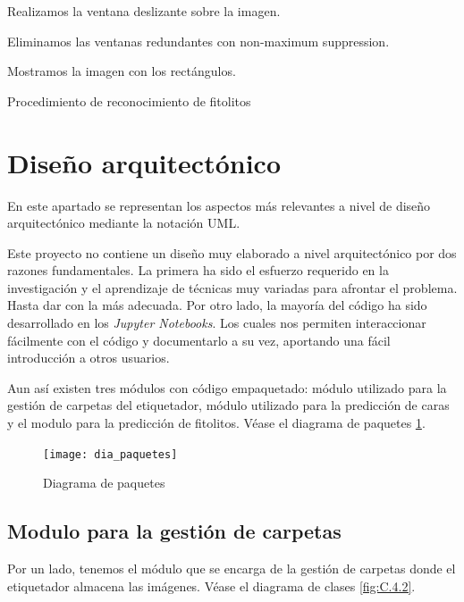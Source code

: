 \begin{algorithm}
    Realizamos la ventana deslizante sobre la imagen.    
    
    
    Eliminamos las ventanas redundantes con non-maximum suppression.

    Mostramos la imagen con los rectángulos.
    \caption{Procedimiento de reconocimiento de fitolitos}
    \label{alg:3}
\end{algorithm}

\section{Diseño arquitectónico}

En este apartado se representan los aspectos más relevantes a nivel de diseño arquitectónico mediante la notación UML.

Este proyecto no contiene un diseño muy elaborado a nivel arquitectónico por dos razones fundamentales. La primera ha sido el esfuerzo requerido en la investigación y el aprendizaje de técnicas muy variadas para afrontar el problema. Hasta dar con la más adecuada. Por otro lado, la mayoría del código ha sido desarrollado en los \textit{Jupyter Notebooks}. Los cuales nos permiten interaccionar fácilmente con el código y documentarlo a su vez, aportando una fácil introducción a otros usuarios.

Aun así existen tres módulos con código empaquetado: módulo utilizado para la gestión de carpetas del etiquetador, módulo utilizado para la predicción de caras y el modulo para la predicción de fitolitos. Véase el diagrama de paquetes \ref{fig:C.4.1}.

\begin{figure}
\centering
\texttt{[image: dia\_paquetes]}
\caption{Diagrama de paquetes}
\label{fig:C.4.1}
\end{figure}

\subsection{Modulo para la gestión de carpetas}

Por un lado, tenemos el módulo que se encarga de la gestión de carpetas donde el etiquetador almacena las imágenes. Véase el diagrama de clases \ref{fig:C.4.2}.

